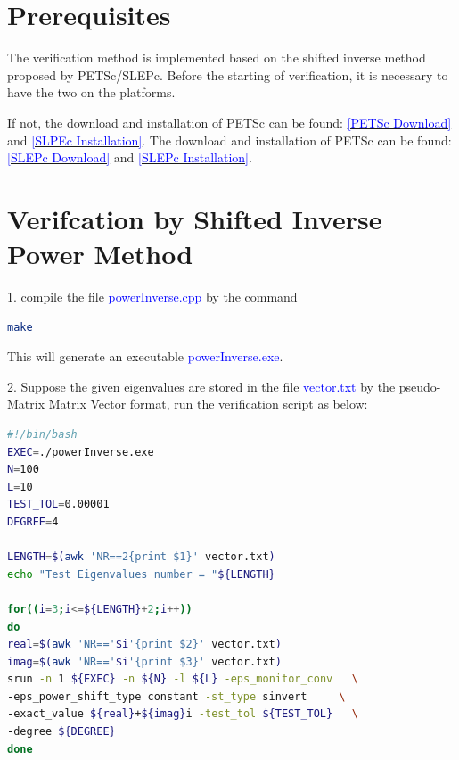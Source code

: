 \documentclass[a4paper, 10 pt]{report}
\begin{document}
	\section{Prerequisites}
	
    The verification method is implemented based on the shifted inverse method proposed by PETSc/SLEPc. Before the starting of verification, it is necessary to have the two on the platforms.
	
	If not, the download and installation of PETSc can be found: \href{https://www.mcs.anl.gov/petsc/download/index.html}{\textcolor{blue}{[PETSc Download]}} and \href{https://www.mcs.anl.gov/petsc/documentation/installation.html}{\textcolor{blue}{[SLPEc Installation]}}. The download and installation of PETSc can be found: \href{http://slepc.upv.es/download/}{\textcolor{blue}{[SLEPc Download]}} and \href{http://slepc.upv.es/documentation/instal.htm}{\textcolor{blue}{[SLEPc Installation]}}.
	
	\section{Verifcation by Shifted Inverse Power Method}
	
	1. compile the file \textcolor{blue}{powerInverse.cpp} by the command
	
	\begin{lstlisting}[language=bash,frame=single]
   make
	\end{lstlisting}
	
	This will generate an executable  \textcolor{blue}{powerInverse.exe}.
	
	2. Suppose the given eigenvalues are stored in the file \textcolor{blue}{vector.txt} by the pseudo-Matrix Matrix Vector format, run the verification script as below:
		\begin{lstlisting}[language=bash,frame=single]
#!/bin/bash
EXEC=./powerInverse.exe
N=100
L=10
TEST_TOL=0.00001
DEGREE=4

LENGTH=$(awk 'NR==2{print $1}' vector.txt)
echo "Test Eigenvalues number = "${LENGTH}

for((i=3;i<=${LENGTH}+2;i++))
do
real=$(awk 'NR=='$i'{print $2}' vector.txt)
imag=$(awk 'NR=='$i'{print $3}' vector.txt)
srun -n 1 ${EXEC} -n ${N} -l ${L} -eps_monitor_conv   \
-eps_power_shift_type constant -st_type sinvert     \
-exact_value ${real}+${imag}i -test_tol ${TEST_TOL}   \
-degree ${DEGREE}
done

   \end{lstlisting}
\end{document}
